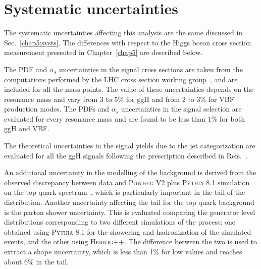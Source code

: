 \section{Systematic uncertainties}\label{chap6:Systematics}

The systematic uncertainties affecting this analysis are the same discussed in Sec.~\ref{chap5:systs}. The differences with respect to the Higgs boson cross section measurement presented in Chapter~\ref{chap5} are described below.

The PDF and $\alpha_s$ uncertainties in the signal cross sections are taken from the computations performed by the LHC cross section working group~\cite{deFlorian:2016spz}, and are included for all the mass points. The value of these uncertainties depends on the resonance mass and vary from 3 to 5\% for ggH and from 2 to 3\% for VBF production modes. The PDFs and $\alpha_{s}$ uncertainties in the signal selection are evaluated for every resonance mass and are found to be less than 1\% for both ggH and VBF.

The theoretical uncertainties in the signal yields due to the jet categorization are evaluated for all the ggH signals following the prescription described in Refs.~\cite{Stewart:2011cf,Heinemeyer:2013tqa}.

An additional uncertainty in the modelling of the \ttbar background is derived from the observed discrepancy between data and \textsc{Powheg V2} plus \textsc{Pythia 8.1} simulation on the top quark \pt spectrum~\cite{Khachatryan:2015oqa}, which is particularly important in the tail of the \mti distribution. Another uncertainty affecting the \mti tail for the top quark background is the parton shower uncertainty. This is evaluated comparing the generator level \mti distributions corresponding to two different simulations of the \ttbar process: one obtained using \textsc{Pythia 8.1} for the showering and hadronization of the simulated events, and the other using \textsc{Herwig++}. The difference between the two is used to extract a shape uncertainty, which is less than 1\% for low \mti values and reaches about 6\% in the \mti tail.






